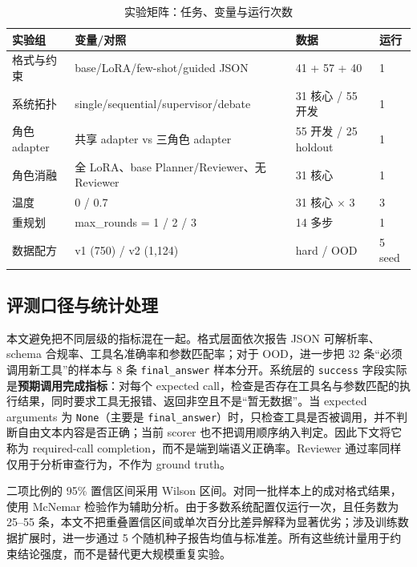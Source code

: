 \documentclass[UTF8,a4paper,12pt]{ctexart}
\begin{document}
\begin{table}[H]
  \centering
  \small
  \caption{实验矩阵：任务、变量与运行次数}
  \label{tab:protocol}
  \begin{tabular}{llll}
    \toprule
    实验组 & 变量/对照 & 数据 & 运行 \\
    \midrule
    格式与约束 & base/LoRA/few-shot/guided JSON & 41 + 57 + 40 & 1 \\
    系统拓扑 & single/sequential/supervisor/debate & 31 核心 / 55 开发 & 1 \\
    角色 adapter & 共享 adapter vs 三角色 adapter & 55 开发 / 25 holdout & 1 \\
    角色消融 & 全 LoRA、base Planner/Reviewer、无 Reviewer & 31 核心 & 1 \\
    温度 & 0 / 0.7 & 31 核心 $\times$ 3 & 3 \\
    重规划 & max\_rounds = 1 / 2 / 3 & 14 多步 & 1 \\
    数据配方 & v1 (750) / v2 (1,124) & hard / OOD & 5 seed \\
    \bottomrule
  \end{tabular}
\end{table}

\subsection{评测口径与统计处理}
本文避免把不同层级的指标混在一起。格式层面依次报告 JSON 可解析率、schema 合规率、工具名准确率和参数匹配率；对于 OOD，进一步把 32 条“必须调用新工具”的样本与 8 条 \texttt{final\_answer} 样本分开。系统层的 \texttt{success} 字段实际是\textbf{预期调用完成指标}：对每个 expected call，检查是否存在工具名与参数匹配的执行结果，同时要求工具无报错、返回非空且不是“暂无数据”。当 expected arguments 为 \texttt{None}（主要是 \texttt{final\_answer}）时，只检查工具是否被调用，并不判断自由文本内容是否正确；当前 scorer 也不把调用顺序纳入判定。因此下文将它称为 required-call completion，而不是端到端语义正确率。Reviewer 通过率同样仅用于分析审查行为，不作为 ground truth。

二项比例的 95\% 置信区间采用 Wilson 区间。对同一批样本上的成对格式结果，使用 McNemar 检验作为辅助分析。由于多数系统配置仅运行一次，且任务数为 25--55 条，本文不把重叠置信区间或单次百分比差异解释为显著优劣；涉及训练数据扩展时，进一步通过 5 个随机种子报告均值与标准差。所有这些统计量用于约束结论强度，而不是替代更大规模重复实验。
\end{document}
